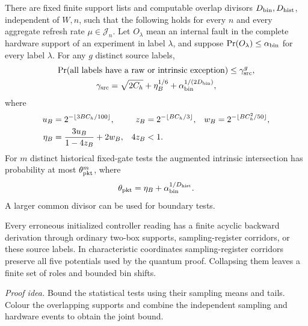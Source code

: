 \begin{proposition}\label{c:source-law}
There are fixed finite support lists and computable overlap divisors
\(D_{\rm bin},D_{\rm hist}\), independent of \(W,n\), such that the
following holds for every \(n\) and every aggregate refresh rate
\(\mu\in\mathcal J_n\). Let \(O_\lambda\) mean an internal fault in the complete
hardware support of an experiment in label \(\lambda\), and suppose
\(\Pr(O_\lambda)\le\alpha_{\rm bin}\) for every label \(\lambda\). For any \(g\) distinct source labels,
\begin{equation}\label{eq:c-gamma}
\begin{gathered}
 \Pr(\textup{all labels have a raw or intrinsic exception})\le\gamma_{\rm src}^g,\\
 \gamma_{\rm src}=\sqrt{2C_h}+\eta_B^{1/6}+\alpha_{\rm bin}^{1/(2D_{\rm bin})},
\end{gathered}
\end{equation}
where
\begin{align}\label{eq:c-eta}
 u_B&=2^{-\lfloor3BC_h/100\rfloor},&
 z_B&=2^{-\lfloor BC_h/3\rfloor},&
 w_B&=2^{-\lfloor BC_h^2/50\rfloor},\notag\\
 \eta_B&=\frac{3u_B}{1-4z_B}+2w_B,
 &4z_B&<1.
\end{align}
For \(m\) distinct historical fixed-gate tests the augmented intrinsic
intersection has probability at most \(\theta_{\rm pkt}^m\), where
\begin{equation}\label{eq:c-theta}
 \theta_{\rm pkt}=\eta_B+\alpha_{\rm bin}^{1/D_{\rm hist}}.
\end{equation}
A larger common divisor can be used for boundary tests.

Every erroneous initialized controller reading has a finite acyclic
backward derivation through ordinary two-box supports, sampling-register corridors,
or these source labels. In characteristic coordinates sampling-register corridors
preserve all five potentials used by the quantum proof. Collapsing them
leaves a finite set of roles and bounded bin shifts.
\end{proposition}
\par\noindent\emph{Proof idea.} Bound the statistical tests using their sampling means and tails. Colour the overlapping supports and combine the independent sampling and hardware events to obtain the joint bound.

